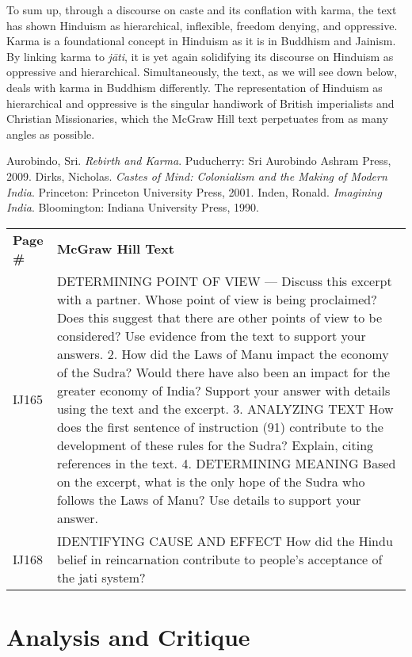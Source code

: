 To sum up, through a discourse on caste and its conflation with karma, the text has shown Hinduism as hierarchical, inflexible, freedom denying, and oppressive. Karma is a foundational concept in Hinduism as it is in Buddhism and Jainism. By linking karma to \textit{jāti}, it is yet again solidifying its discourse on Hinduism as oppressive and hierarchical. Simultaneously, the text, as we will see down below, deals with karma in Buddhism differently. The representation of Hinduism as hierarchical and oppressive is the singular handiwork of British imperialists and Christian Missionaries, which the McGraw Hill text perpetuates from as many angles as possible.

\begin{thebibliography}{99}
 Aurobindo, Sri. \textit{Rebirth and Karma}. Puducherry: Sri Aurobindo Ashram Press, 2009.
 Dirks, Nicholas. \textit{Castes of Mind: Colonialism and the Making of Modern India}. Princeton: Princeton University Press, 2001.
 Inden, Ronald. \textit{Imagining India}. Bloomington: Indiana University Press, 1990.
\end{thebibliography}
\newpage

\begin{longtable}{|>{\raggedleft}p{1.5cm}|p{8.5cm}|}
\multicolumn{2}{c}{\textbf{Table: 8}}\\ 
\hline
\textbf{Page \#} & \textbf{McGraw Hill Text} \tabularnewline
\hline
IJ165 & DETERMINING POINT OF VIEW — Discuss this excerpt with a partner. Whose point of view is being proclaimed? Does this suggest that there are other points of view to be considered? Use evidence from the text to support your answers. 2. How did the Laws of Manu impact the economy of the Sudra? Would there have also been an impact for the greater economy of India? Support your answer with details using the text and the excerpt. 3. ANALYZING TEXT How does the first sentence of instruction (91) contribute to the development of these rules for the Sudra? Explain, citing references in the text. 4. DETERMINING MEANING Based on the excerpt, what is the only hope of the Sudra who follows the Laws of Manu? Use details to support your answer. \tabularnewline
\hline
IJ168 & IDENTIFYING CAUSE AND EFFECT How did the Hindu belief in reincarnation contribute to people’s acceptance of the jati system? \tabularnewline
\hline
\end{longtable}

\section*{Analysis and Critique} 

